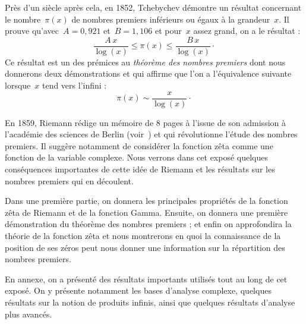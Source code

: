 		Près d'un siècle après cela, en 1852, Tchebychev démontre un résultat concernant le nombre~$\pi(x)$ de nombres premiers inférieurs ou égaux à la grandeur~$x$. Il prouve qu'avec~$A=0{,}921$ et~$B=1{,}106$ et pour~$x$ assez grand, on a le résultat :
		\[
			\frac{A\,x}{\log(x)}\leq\pi(x)\leq\frac{B\,x}{\log(x)}\cdot
		\]
		Ce résultat est un des prémices au \emph{théorème des nombres premiers} dont nous donnerons deux démonstrations et qui affirme que l'on a l'équivalence suivante lorsque~$x$ tend vers l'infini :
		\[
			\pi(x)\sim\frac{x}{\log(x)}\cdot
		\]
		
		En 1859, Riemann  rédige un mémoire de 8 pages à l'issue de son admission à l'académie des sciences de Berlin (voir~\cite{ArticRiemann}) et qui révolutionne l'étude des nombres premiers. Il suggère notamment de considérer la fonction zêta comme une fonction de la variable complexe. Nous verrons dans cet exposé quelques conséquences importantes de cette idée de Riemann et les résultats sur les nombres premiers qui en découlent.
		
		\medskip
		Dans une première partie, on donnera les principales propriétés de la fonction zêta de Riemann et de la fonction Gamma. Ensuite, on donnera une première démonstration du théorème des nombres premiers ; et enfin on approfondira la théorie de la fonction zêta et nous montrerons en quoi la connaissance de la position de ses zéros peut nous donner une information sur la répartition des nombres premiers.
		
		En annexe, on a présenté des résultats importants utilisés tout au long de cet exposé. On y présente notamment les bases d'analyse complexe, quelques résultats sur la notion de produits infinis, ainsi que quelques résultats d'analyse plus avancés.
		\Tbreak
